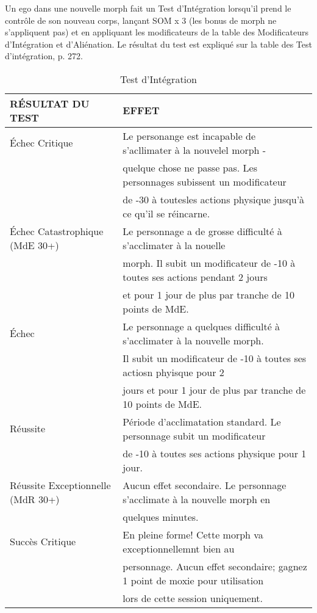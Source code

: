 Un ego dans une nouvelle morph fait un Test d'Intégration lorsqu'il prend le contrôle de son nouveau corps, lançant SOM x 3 (les bonus de morph ne s'appliquent pas) et en appliquant les modificateurs de la table des Modificateurs d'Intégration et d'Aliénation. Le résultat du test est expliqué sur la table des Test d'intégration, p. 272. 

\begin{table} \caption{Test d'Intégration} \begin{tabular}{|l|l|} 

\hline

RÉSULTAT DU TEST &EFFET\\ \hline

Échec Critique &Le personange est incapable de s'acllimater à la nouvelel morph - \\ &quelque chose ne passe pas. Les personnages subissent un modificateur\\ &de -30 à toutesles actions physique jusqu'à ce qu'il se réincarne. \\ \hline

Échec Catastrophique (MdE 30+) &Le personnage a de grosse difficulté à s'acclimater à la nouelle\\ &morph. Il subit un modificateur de -10 à toutes ses actions pendant 2 jours\\ &et pour 1 jour de plus par tranche de 10 points de MdE. \\ \hline

Échec &Le personnage a quelques difficulté à s'acclimater à la nouvelle morph. \\ &Il subit un modificateur de -10 à toutes ses actiosn phyisque pour 2\\ &jours et pour 1 jour de plus par tranche de 10 points de MdE. \\ \hline

Réussite &Période d'acclimatation standard. Le personnage subit un modificateur\\ &de -10 à toutes ses actions physique pour 1 jour. \\ \hline

Réussite Exceptionnelle (MdR 30+) &Aucun effet secondaire. Le personnage s'acclimate à la nouvelle morph en \\ &quelques minutes. \\ \hline

Succès Critique &En pleine forme! Cette morph va exceptionnellemnt bien au\\ &personnage. Aucun effet secondaire; gagnez 1 point de moxie pour utilisation\\ &lors de cette session uniquement. \\ \hline

\end{tabular} \end{table} 

